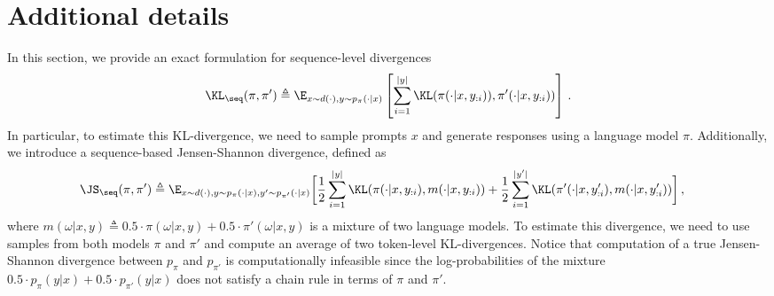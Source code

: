 \section{Additional details}\label{app:misc}

In this section, we provide an exact formulation for sequence-level divergences
\begin{equation}\label{eq:kl_divergence_lms}
    \KL_{\seq}(\pi,  \pi') \triangleq \E_{x \sim d(\cdot), y \sim p_{\pi}(\cdot | x)}\left[ \sum_{i=1}^{|y|}\KL(\pi(\cdot | x, y_{:i})), \pi'(\cdot | x, y_{:i})) \right]\,.
\end{equation}
In particular, to estimate this KL-divergence, we need to sample prompts $x$ and generate responses using a language model $\pi$. Additionally, we introduce a sequence-based Jensen-Shannon divergence, defined as
\begin{equation}\label{eq:js_divergence_lms}
    \begin{split}
    \JS_{\seq}(\pi, \pi') &\triangleq \E_{x \sim d(\cdot), y \sim p_{\pi}(\cdot | x), y' \sim p_{\pi'}(\cdot | x)}\bigg[ \frac{1}{2}\sum_{i=1}^{|y|}\KL(\pi(\cdot | x, y_{:i}),  m(\cdot | x, y_{:i}))  + \frac{1}{2}\sum_{i=1}^{|y'|}\KL(\pi'(\cdot | x, y'_{:i}), m(\cdot | x, y'_{:i})) \bigg]\,,
    \end{split}
\end{equation}
where $m(\omega | x, y) \triangleq 0.5 \cdot \pi(\omega| x,y) + 0.5 \cdot \pi'(\omega|x,y)$ is a mixture of two language models. To estimate this divergence, we need to use samples from both models $\pi$ and $\pi'$ and compute an average of two token-level KL-divergences. Notice that computation of a true Jensen-Shannon divergence between $p_{\pi}$ and $p_{\pi'}$ is computationally infeasible since the log-probabilities of the mixture $0.5 \cdot p_{\pi}(y|x) + 0.5 \cdot p_{\pi'}(y|x)$ does not satisfy a chain rule in terms of $\pi$ and $\pi'$.